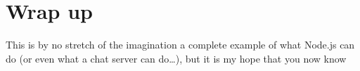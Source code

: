 \documentclass[12pt]{article}
\let\oldmarginpar\marginpar
\renewcommand\marginpar[1]{\-\oldmarginpar[\raggedleft\footnotesize #1]
{\raggedright\footnotesize #1}}
\newcommand{\todo}[1]{\marginpar{\color{red} #1}}
\newenvironment{code}[3][false]
 {
  \VerbatimEnvironment

  \begin{lstlisting}
  \caption{#3}
  \begin{verbatim}}
 {
  \end{verbatim}
  \end{lstlisting}
 }
\begin{document}
\section{Wrap up}
This is by no stretch of the imagination a complete example of what Node.js can do (or even what a chat server can do\ldots), but it is my hope that you now know 




\end{document}
